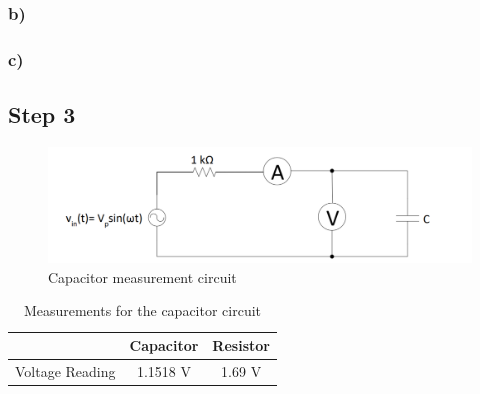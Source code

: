 \documentclass[letterpaper,12pt]{article}
\begin{document}
\subsubsection{b)}

\subsubsection{c)}
\subsection{Step 3}
\begin{figure}[H]
	\centering
   \includegraphics[width=1\textwidth]{PRE3.png}
   \caption{Capacitor measurement circuit}
\end{figure}


\begin{table}[H]
	\begin{center}
		\caption{Measurements for the capacitor circuit}
		\vspace{2mm}
		\begin{tabular}{||c | c | c||} 
		 \hline
		   & Capacitor & Resistor \\ [0.5ex] 
		 \hline\hline
		 Voltage Reading & 1.1518 V & 1.69 V  \\ 
		 \hline
		\end{tabular}
\end{center}
\end{table}
\end{document}
